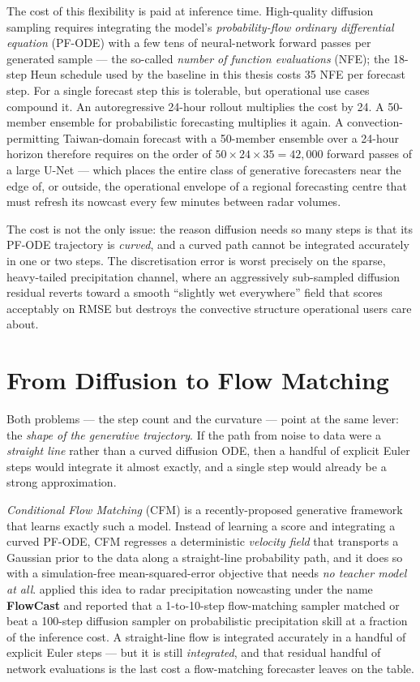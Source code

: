 The cost of this flexibility is paid at inference time. High-quality diffusion sampling requires integrating the model's \emph{probability-flow ordinary differential equation} (PF-ODE) with a few tens of neural-network forward passes per generated sample --- the so-called \emph{number of function evaluations} (NFE); the 18-step Heun schedule used by the baseline in this thesis costs 35 NFE per forecast step. For a single forecast step this is tolerable, but operational use cases compound it. An autoregressive 24-hour rollout multiplies the cost by 24. A 50-member ensemble for probabilistic forecasting multiplies it again. A convection-permitting Taiwan-domain forecast with a 50-member ensemble over a 24-hour horizon therefore requires on the order of $50 \times 24 \times 35 = 42{,}000$ forward passes of a large U-Net --- which places the entire class of generative forecasters near the edge of, or outside, the operational envelope of a regional forecasting centre that must refresh its nowcast every few minutes between radar volumes.

The cost is not the only issue: the reason diffusion needs so many steps is that its PF-ODE trajectory is \emph{curved}, and a curved path cannot be integrated accurately in one or two steps. The discretisation error is worst precisely on the sparse, heavy-tailed precipitation channel, where an aggressively sub-sampled diffusion residual reverts toward a smooth ``slightly wet everywhere'' field that scores acceptably on RMSE but destroys the convective structure operational users care about.

\section{From Diffusion to Flow Matching}
\label{sec:intro-flow}

Both problems --- the step count and the curvature --- point at the same lever: the \emph{shape of the generative trajectory}. If the path from noise to data were a \emph{straight line} rather than a curved diffusion ODE, then a handful of explicit Euler steps would integrate it almost exactly, and a single step would already be a strong approximation.

\emph{Conditional Flow Matching} (CFM) \citep{lipman2023flow,tong2024improving} is a recently-proposed generative framework that learns exactly such a model. Instead of learning a score and integrating a curved PF-ODE, CFM regresses a deterministic \emph{velocity field} that transports a Gaussian prior to the data along a straight-line probability path, and it does so with a simulation-free mean-squared-error objective that needs \emph{no teacher model at all}. \citet{ribeiro2025flowcast} applied this idea to radar precipitation nowcasting under the name \textbf{FlowCast} and reported that a 1-to-10-step flow-matching sampler matched or beat a 100-step diffusion sampler on probabilistic precipitation skill at a fraction of the inference cost. A straight-line flow is integrated accurately in a handful of explicit Euler steps --- but it is still \emph{integrated}, and that residual handful of network evaluations is the last cost a flow-matching forecaster leaves on the table.

